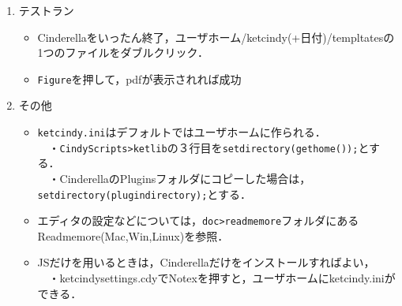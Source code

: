 \documentclass{ujarticle}
\begin{document}
\begin{enumerate}[\bf\large 1.]
\item テストラン\vspace{-2mm}

\begin{itemize}
 \item Cinderellaをいったん終了，ユーザホーム/ketcindy(+日付)/templtatesの1つのファイルをダブルクリック．\vspace{-1mm}
\item\verb|Figure|を押して，pdfが表示されれば成功
\end{itemize}

\item  その他\vspace{-2mm}
\begin{itemize}
\item \verb|ketcindy.ini|はデフォルトではユーザホームに作られる．\\
　・\verb|CindyScripts>ketlib|の３行目を\verb|setdirectory(gethome());|とする．\\
　・CinderellaのPluginsフォルダにコピーした場合は，\verb|setdirectory(plugindirectory);|とする．

\item エディタの設定などについては，\verb|doc>readmemore|フォルダにあるReadmemore(Mac,Win,Linux)を参照．
\item \ketcindy JSだけを用いるときは，Cinderellaだけをインストールすればよい，\\
　・ketcindysettings.cdyでNotexを押すと，ユーザホームにketcindy.iniができる．
\end{itemize}

\end{enumerate}
\end{document}
